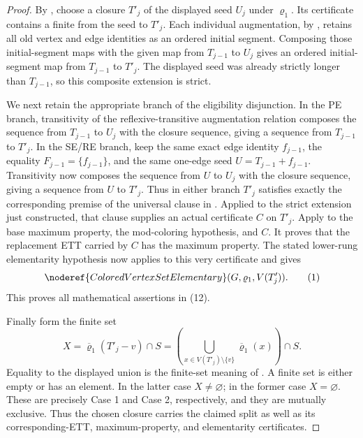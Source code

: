 \begin{proof}
By , choose a closure \(T'_j\) of the
displayed seed \(U_j\) under \(\varrho_1\).  Its
 certificate contains a finite
 from the seed to \(T'_j\).
Each individual augmentation, by , retains
all old vertex and edge identities as an ordered initial segment.
Composing those initial-segment maps with the given map from
\(T_{j-1}\) to \(U_j\) gives an ordered initial-segment map from
\(T_{j-1}\) to \(T'_j\).  The displayed seed was already strictly longer
than \(T_{j-1}\), so this composite extension is strict.

We next retain the appropriate branch of the eligibility disjunction.  In
the PE branch, transitivity of the reflexive-transitive augmentation
relation  composes the sequence
from \(T_{j-1}\) to \(U_j\) with the closure sequence, giving a
sequence from \(T_{j-1}\) to \(T'_j\).  In the SE/RE branch, keep the
same exact edge identity \(f_{j-1}\), the equality
\(F_{j-1}=\{f_{j-1}\}\), and the same one-edge seed
\(U=T_{j-1}+f_{j-1}\).  Transitivity now composes the sequence from
\(U\) to \(U_j\) with the closure sequence, giving a sequence from
\(U\) to \(T'_j\).  Thus in either branch \(T'_j\) satisfies exactly the
corresponding premise of the universal clause in .
Applied to the strict extension just constructed, that clause supplies an actual
 certificate \(C\) on
\(T'_j\).  Apply  to the base maximum
property, the mod-coloring hypothesis, and \(C\).  It proves that the
replacement ETT carried by \(C\) has the maximum property.  The stated
lower-rung elementarity hypothesis now applies to this very certificate
and gives
\[
        \noderef{ColoredVertexSetElementary}
              (G,\varrho_1,V(T'_j)).                           \tag{1}
\]
This proves all mathematical assertions in (12).

Finally form the finite set
\[
 X=\overline\varrho_1(T'_j-v)\cap S
   =\left(\bigcup_{x\in V(T'_j)\setminus\{v\}}
                    \overline\varrho_1(x)\right)\cap S.
\]
Equality to the displayed union is the finite-set meaning of
.  A finite set is either empty or has an element.
In the latter case \(X\ne\varnothing\); in the former case
\(X=\varnothing\).  These are precisely Case 1 and Case 2, respectively,
and they are mutually exclusive.  Thus the chosen closure carries the
claimed split as well as its corresponding-ETT, maximum-property, and
elementarity certificates.
\end{proof}
